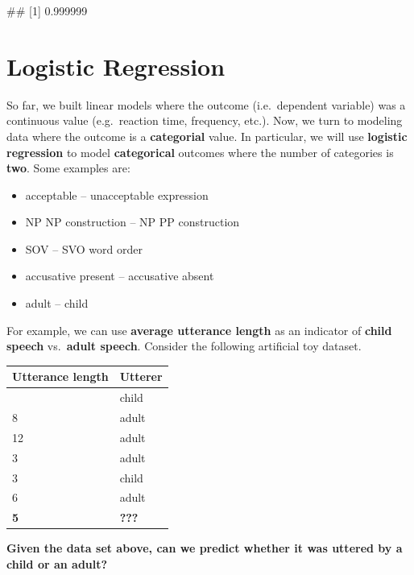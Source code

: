 \documentclass[
]{book}
\newenvironment{Shaded}{\begin{snugshade}}{\end{snugshade}}
\newcommand{\NormalTok}[1]{#1}
\providecommand{\tightlist}{%
  \setlength{\itemsep}{0pt}\setlength{\parskip}{0pt}}
\begin{document}
\begin{Shaded}
\begin{Highlighting}[]
\NormalTok{\#\# [1] 0.999999}
\end{Highlighting}
\end{Shaded}

\chapter{Logistic Regression}\label{logistic-regression}

So far, we built linear models where the outcome (i.e.~dependent variable) was a continuous value (e.g.~reaction time, frequency, etc.). Now, we turn to modeling data where the outcome is a \textbf{categorial} value. In particular, we will use \textbf{logistic regression} to model \textbf{categorical} outcomes where the number of categories is \textbf{two}. Some examples are:

\begin{itemize}
\tightlist
\item
  acceptable -- unacceptable expression
\item
  NP NP construction -- NP PP construction
\item
  SOV -- SVO word order
\item
  accusative present -- accusative absent
\item
  adult -- child
\end{itemize}

For example, we can use \textbf{average utterance length} as an indicator of \textbf{child speech} vs.~\textbf{adult speech}. Consider the following artificial toy dataset.

\begin{longtable}[]{@{}ll@{}}
\toprule\noalign{}
\textbf{Utterance length } & \textbf{Utterer} \\
\midrule\noalign{}
\endhead
\bottomrule\noalign{}
\endlastfoot
2 & child \\
8 & adult \\
12 & adult \\
3 & adult \\
3 & child \\
6 & adult \\
\textbf{5} & \textbf{???} \\
\end{longtable}

\textbf{Given the data set above, can we predict whether it was uttered by a child or an adult?}
\end{document}
